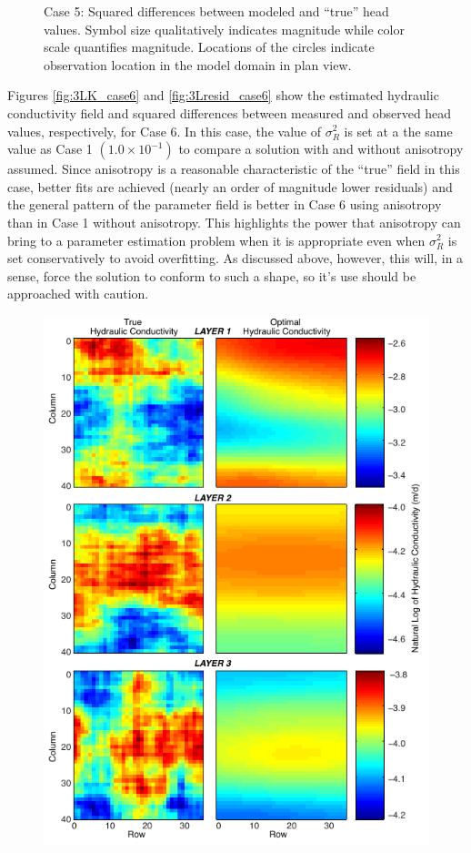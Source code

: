 \documentclass[11pt,oneside,onecolumn]{usgsreport}
\begin{document}
\begin{appendix}
\begin{figure}[!t]
\caption{\label{fig:3Lresid_case5}Case 5: Squared differences between modeled
and ``true'' head values. Symbol size qualitatively indicates magnitude
while color scale quantifies magnitude. Locations of the circles indicate
observation location in the model domain in plan view.}
\end{figure}


Figures \ref{fig:3LK_case6} and \ref{fig:3Lresid_case6} show the
estimated hydraulic conductivity field and squared differences between
measured and observed head values, respectively, for Case 6. In this
case, the value of $\sigma_{R}^{2}$ is set at a the same value as
Case 1 $\left(1.0\times10^{-1}\right)$ to compare a solution with
and without anisotropy assumed. Since anisotropy is a reasonable characteristic
of the ``true'' field in this case, better fits are achieved (nearly
an order of magnitude lower residuals) and the general pattern of
the parameter field is better in Case 6 using anisotropy than in Case
1 without anisotropy. This highlights the power that anisotropy can
bring to a parameter estimation problem when it is appropriate even
when $\sigma_{R}^{2}$ is set conservatively to avoid overfitting.
As discussed above, however, this will, in a sense, force the solution
to conform to such a shape, so it's use should be approached with
caution.

\begin{figure}[!t]
\begin{center}\includegraphics{figures/3KL_case6}\end{center}


\end{figure}
\end{appendix}
\end{document}
